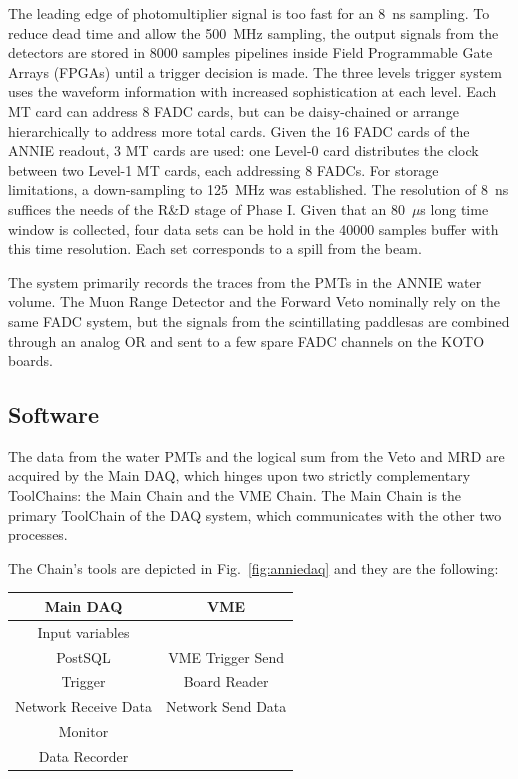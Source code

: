  The leading edge of photomultiplier signal is too fast for an 8~ns sampling.
 To reduce dead time and allow the 500~MHz sampling, the output signals from the detectors %
 are stored in 8000 samples pipelines inside Field Programmable Gate Arrays (FPGAs) until %
 a trigger decision is made.
 The three levels trigger system uses the waveform information with increased %
 sophistication at each level.
 Each MT card can address 8 FADC cards, but can be daisy-chained or arrange hierarchically to %
 address more total cards.
 Given the 16 FADC cards of the ANNIE readout, 3 MT cards are used: %
 one Level-0 card distributes the clock between two Level-1 MT cards, each addressing 8 FADCs.
 For storage limitations, a down-sampling to 125~MHz was established.
 The resolution of 8~ns suffices the needs of the R\&D stage of Phase I.
 Given that an 80~$\mu$s long time window is collected, four data sets can be hold in the 40000 samples buffer %
 with this time resolution.
 Each set corresponds to a spill from the beam.

 The system primarily records the traces from the PMTs in the ANNIE water volume.
 The Muon Range Detector and the Forward Veto nominally rely on the same FADC system, but the signals %
 from the scintillating paddlesas are combined through an analog OR and sent to a %
 few spare FADC channels on the KOTO boards. 


\subsection{Software}
\label{sec:main_s}

The data from the water PMTs and the logical sum from the Veto and MRD are acquired by the Main DAQ, %
which hinges upon two strictly complementary ToolChains: the Main Chain and the VME Chain.
The Main Chain is the primary ToolChain of the DAQ system, which communicates with the other two %
processes.

The Chain's tools are depicted in Fig.~\ref{fig:anniedaq} and they are the following:

\begin{center}
  \small
  \begin{tabular}{cc}
    \toprule
    \textbf{Main DAQ}	& \textbf{VME}		\\
    \midrule
    Input variables 		&   \\
    PostSQL 			& VME Trigger Send   \\
    Trigger			& Board Reader	\\
    Network Receive Data	& Network Send Data	\\
    Monitor			& 	\\
    Data Recorder		& 	\\
    \bottomrule
  \end{tabular}
\end{center}

